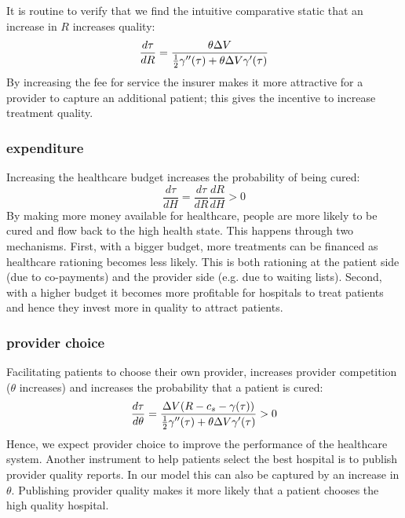 \documentclass[12pt,english,a4paper]{article}
\begin{document}
It is routine to verify that we find the intuitive comparative static that an increase in \(R\) increases quality:
\begin{equation}
\label{eq:20}
\frac{d\tau}{dR} = \frac{\theta \Delta V}{ \textstyle{1\over 2} \gamma''(\tau)+\theta \Delta V \gamma'(\tau) }
\end{equation}
By increasing the fee for service the insurer makes it more attractive for a provider to capture an additional patient; this gives the incentive to increase treatment quality.


\subsubsection{expenditure}
\label{sec:org69b8606}

Increasing the healthcare budget increases the probability of being cured:
\begin{equation}
\label{eq:16}
\frac{d\tau}{dH} = \frac{d\tau}{dR} \frac{dR}{dH} > 0
\end{equation}
By making more money available for healthcare, people are more likely to be cured and flow back to the high health state. This happens through two mechanisms. First, with a bigger budget, more treatments can be financed as healthcare rationing becomes less likely. This is both rationing at the patient side (due to co-payments) and the provider side (e.g. due to waiting lists). Second, with a higher budget it becomes more profitable for hospitals to treat patients and hence they invest more in quality to attract patients.

\subsubsection{provider choice}
\label{sec:orgc9b3b79}

Facilitating patients to choose their own provider, increases provider competition (\(\theta\) increases) and increases the probability that a patient is cured:
\begin{equation}
\label{eq:14}
\frac{d\tau}{d\theta} = \frac{\Delta V (R-c_s-\gamma(\tau))}{ \textstyle{1\over 2} \gamma''(\tau)+\theta \Delta V \gamma'(\tau) } > 0
\end{equation}
Hence, we expect provider choice to improve the performance of the healthcare system. Another instrument to help patients select the best hospital is to publish provider quality reports. In our model this can also be captured by an increase in \(\theta\). Publishing provider quality makes it more likely that a patient chooses the high quality hospital.
\end{document}
